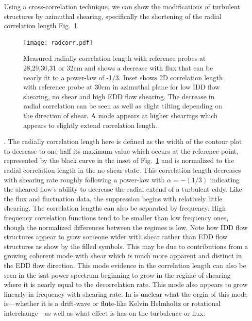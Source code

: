 \documentclass[%
 aps,
 prl,
 amsmath,amssymb,
 reprint,%
]{revtex4-1}
\begin{document}
Using a cross-correlation technique, we can show the modifications of turbulent structures by azimuthal shearing, specifically the shortening of the radial correlation length
Fig.~\ref{fig:radcorr}
\begin{figure}
\begin{center}
\texttt{[image: radcorr.pdf]}%
\end{center}
\caption{\label{fig:radcorr} Measured radially correlation length with reference probes at 28,29,30,31 or 32cm and shows a decrease with flux that can be nearly fit to a power-law of -1/3. Inset shows 2D correlation length with reference probe at 30cm in azimuthal plane for low IDD flow shearing, no shear and high EDD flow shearing. The decrease in radial correlation can be seen as well as slight tilting depending on the direction of shear. A mode appears at higher shearings which appears to slightly extend correlation length.}
\end{figure}
. The radially correlation length here is defined as the width of the contour plot to decrease to one-half its maximum value which occurs at the reference point, represented by the black curve in the inset of Fig.~\ref{fig:radcorr} and is normalized to the radial correlation length in the no-shear state. This correlation length decreases with shearing rate roughly following a power-law with $\alpha = -(1/3)$ indicating the sheared flow's ability to decrease the radial extend of a turbulent eddy. Like the flux and fluctuation data, the suppression begins with relatively little shearing. The correlation lengths can also be separated by frequency. High frequency correlation functions tend to be smaller than low frequency ones, though the normalized differences between the regimes is low. Note how IDD flow structures appear to grow someone wider with shear rather than EDD flow structures as show by the filled symbols. This may be due to contributions from a growing coherent mode with shear which is much more apparent and distinct in the EDD flow direction. This mode evidence in the correlation length can also be seen in the isat power spectrum
beginning to grow in the regime of shearing where it is nearly equal to the decorrelation rate. This mode also appears to grow linearly in frequency with shearing rate. In is unclear what the orgin of this mode is---whether it is a drift-wave or flute-like Kelvin Helmholtz or rotational interchange---as well as what effect is has on the turbulence or flux. 
\end{document}
